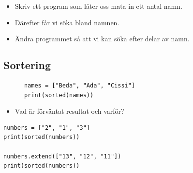 \begin{frame}[fragile]
  \begin{exercise}[search.py]
    \begin{itemize}
      \item Skriv ett program som låter oss mata in ett antal 
        namn.
      \item Därefter får vi söka bland namnen.
    \end{itemize}
  \end{exercise}

  \begin{exercise}
    \begin{itemize}
      \item Ändra programmet så att vi kan söka efter delar av namn.
    \end{itemize}
  \end{exercise}
\end{frame}

\subsection{Sortering}

\begin{frame}[fragile]
  \begin{example}[Sortering]
    \begin{verbatim}
      names = ["Beda", "Ada", "Cissi"]
      print(sorted(names))
    \end{verbatim}
  \end{example}

  \begin{exercise}
    \begin{itemize}
      \item Vad är förväntat resultat och varför?
    \end{itemize}
    \begin{verbatim}
numbers = ["2", "1", "3"]
print(sorted(numbers))

numbers.extend(["13", "12", "11"])
print(sorted(numbers))
    \end{verbatim}
  \end{exercise}
\end{frame}

